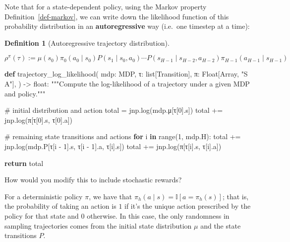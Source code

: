 \documentclass[
  letterpaper,
  DIV=11,
  numbers=noendperiod]{scrreprt}
\newenvironment{Shaded}{\begin{snugshade}}{\end{snugshade}}
\newcommand{\BuiltInTok}[1]{\textcolor[rgb]{0.00,0.23,0.31}{#1}}
\newcommand{\CommentTok}[1]{\textcolor[rgb]{0.37,0.37,0.37}{#1}}
\newcommand{\ControlFlowTok}[1]{\textcolor[rgb]{0.00,0.23,0.31}{\textbf{#1}}}
\newcommand{\DecValTok}[1]{\textcolor[rgb]{0.68,0.00,0.00}{#1}}
\newcommand{\KeywordTok}[1]{\textcolor[rgb]{0.00,0.23,0.31}{\textbf{#1}}}
\newcommand{\NormalTok}[1]{\textcolor[rgb]{0.00,0.23,0.31}{#1}}
\newcommand{\OperatorTok}[1]{\textcolor[rgb]{0.37,0.37,0.37}{#1}}
\newcommand{\StringTok}[1]{\textcolor[rgb]{0.13,0.47,0.30}{#1}}
\theoremstyle{plain}
\theoremstyle{plain}
\theoremstyle{definition}
\theoremstyle{definition}
\newtheorem{definition}{Definition}[chapter]
\theoremstyle{remark}
\begin{document}
Note that for a state-dependent policy, using the Markov property
Definition~\ref{def-markov}, we can write down the likelihood function
of this probability distribution in an \textbf{autoregressive} way
(i.e.~one timestep at a time):

\begin{definition}[Autoregressive trajectory
distribution]\protect\hypertarget{def-autoregressive_trajectories}{}\label{def-autoregressive_trajectories}

\[\rho^{\pi}(\tau) := \mu(s_0) \pi_0(a_0 \mid s_0) P(s_1 \mid s_0, a_0) \cdots P(s_{H-1} \mid s_{H-2}, a_{H-2}) \pi_{H-1}(a_{H-1} \mid s_{H-1})\]

\end{definition}

\begin{Shaded}
\begin{Highlighting}[]
\KeywordTok{def}\NormalTok{ trajectory\_log\_likelihood(}
\NormalTok{    mdp: MDP,}
\NormalTok{    τ: }\BuiltInTok{list}\NormalTok{[Transition],}
\NormalTok{    π: Float[Array, }\StringTok{"S A"}\NormalTok{],}
\NormalTok{) }\OperatorTok{{-}\textgreater{}} \BuiltInTok{float}\NormalTok{:}
    \CommentTok{"""Compute the log{-}likelihood of a trajectory under a given MDP and policy."""}

    \CommentTok{\# initial distribution and action}
\NormalTok{    total }\OperatorTok{=}\NormalTok{ jnp.log(mdp.μ[τ[}\DecValTok{0}\NormalTok{].s])}
\NormalTok{    total }\OperatorTok{+=}\NormalTok{ jnp.log(π[τ[}\DecValTok{0}\NormalTok{].s, τ[}\DecValTok{0}\NormalTok{].a])}

    \CommentTok{\# remaining state transitions and actions}
    \ControlFlowTok{for}\NormalTok{ i }\KeywordTok{in} \BuiltInTok{range}\NormalTok{(}\DecValTok{1}\NormalTok{, mdp.H):}
\NormalTok{        total }\OperatorTok{+=}\NormalTok{ jnp.log(mdp.P[τ[i }\OperatorTok{{-}} \DecValTok{1}\NormalTok{].s, τ[i }\OperatorTok{{-}} \DecValTok{1}\NormalTok{].a, τ[i].s])}
\NormalTok{        total }\OperatorTok{+=}\NormalTok{ jnp.log(π[τ[i].s, τ[i].a])}

    \ControlFlowTok{return}\NormalTok{ total}
\end{Highlighting}
\end{Shaded}

How would you modify this to include stochastic rewards?

For a deterministic policy \(\pi\), we have that
\(\pi_h(a \mid s) = \mathbb{I}[a = \pi_h(s)]\); that is, the probability
of taking an action is \(1\) if it's the unique action prescribed by the
policy for that state and \(0\) otherwise. In this case, the only
randomness in sampling trajectories comes from the initial state
distribution \(\mu\) and the state transitions \(P\).
\end{document}
